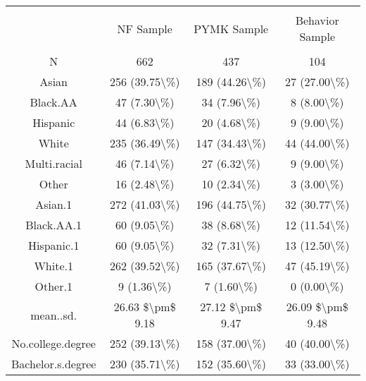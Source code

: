 
\begin{table}[!htbp] \centering 
  \caption{} 
  \label{} 
\begin{tabular}{@{\extracolsep{5pt}} cccc} 
\\[-1.8ex]\hline 
\hline \\[-1.8ex] 
 & NF Sample & PYMK Sample & Behavior Sample \\ 
\hline \\[-1.8ex] 
N & 662 & 437 & 104 \\ 
Asian & 256 (39.75\textbackslash \%) & 189 (44.26\textbackslash \%) & 27 (27.00\textbackslash \%) \\ 
Black.AA & 47 (7.30\textbackslash \%) & 34 (7.96\textbackslash \%) & 8 (8.00\textbackslash \%) \\ 
Hispanic & 44 (6.83\textbackslash \%) & 20 (4.68\textbackslash \%) & 9 (9.00\textbackslash \%) \\ 
White & 235 (36.49\textbackslash \%) & 147 (34.43\textbackslash \%) & 44 (44.00\textbackslash \%) \\ 
Multi.racial & 46 (7.14\textbackslash \%) & 27 (6.32\textbackslash \%) & 9 (9.00\textbackslash \%) \\ 
Other & 16 (2.48\textbackslash \%) & 10 (2.34\textbackslash \%) & 3 (3.00\textbackslash \%) \\ 
Asian.1 & 272 (41.03\textbackslash \%) & 196 (44.75\textbackslash \%) & 32 (30.77\textbackslash \%) \\ 
Black.AA.1 & 60 (9.05\textbackslash \%) & 38 (8.68\textbackslash \%) & 12 (11.54\textbackslash \%) \\ 
Hispanic.1 & 60 (9.05\textbackslash \%) & 32 (7.31\textbackslash \%) & 13 (12.50\textbackslash \%) \\ 
White.1 & 262 (39.52\textbackslash \%) & 165 (37.67\textbackslash \%) & 47 (45.19\textbackslash \%) \\ 
Other.1 & 9 (1.36\textbackslash \%) & 7 (1.60\textbackslash \%) & 0 (0.00\textbackslash \%) \\ 
mean..sd. & 26.63 \$\textbackslash pm\$ 9.18 & 27.12 \$\textbackslash pm\$ 9.47 & 26.09 \$\textbackslash pm\$ 9.48 \\ 
No.college.degree & 252 (39.13\textbackslash \%) & 158 (37.00\textbackslash \%) & 40 (40.00\textbackslash \%) \\ 
Bachelor.s.degree & 230 (35.71\textbackslash \%) & 152 (35.60\textbackslash \%) & 33 (33.00\textbackslash \%) \\ 

\end{tabular}
\end{table}
